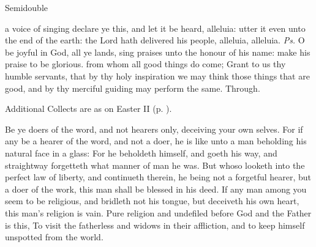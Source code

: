 \begin{inhead}
    {Semidouble}
\end{inhead}
\par\noindent
{}

\introit
{} a voice of singing declare ye this, and let it be heard, alleluia: utter it even unto the end of the earth: the Lord hath delivered his people, alleluia, alleluia. \textit{Ps.} O be joyful in God, all ye lands, sing praises unto the honour of his name: make his praise to be glorious.
\collect
{} from whom all good things do come; Grant to us thy humble servants, that by thy holy inspiration we may think those things that are good, and by thy merciful guiding may perform the same. Through.
\begin{rubric}
    Additional Collects are as on Easter II (p. \pageref{EasterII}).
\end{rubric}
 Be ye doers of the word, and not hearers only, deceiving your own selves. For if any be a hearer of the word, and not a doer, he is like unto a man beholding his natural face in a glass: For he beholdeth himself, and goeth his way, and straightway forgetteth what manner of man he was. But whoso looketh into the perfect law of liberty, and continueth therein, he being not a forgetful hearer, but a doer of the work, this man shall be blessed in his deed. If any man among you seem to be religious, and bridleth not his tongue, but deceiveth his own heart, this man's religion is vain. Pure religion and undefiled before God and the Father is this, To visit the fatherless and widows in their affliction, and to keep himself unspotted from the world.
